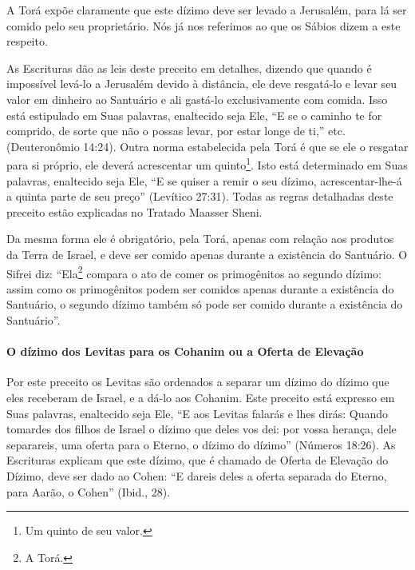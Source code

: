 A Torá expõe claramente que este dízimo deve ser levado a Jerusalém,
para lá ser comido pelo seu proprietário. Nós já nos referimos ao que os
Sábios dizem a este respeito.

As Escrituras dão as leis deste preceito em detalhes, dizendo que quando
é impossível levá-lo a Jerusalém devido à distância, ele deve resgatá-lo
e levar seu valor em dinheiro ao Santuário e ali gastá-lo
exclusivamente com comida. Isso está estipulado em Suas palavras,
enaltecido seja Ele, ``E se o caminho te for comprido, de sorte que não o possas levar, por estar longe de ti,'' etc. (Deuteronômio 14:24). Outra norma estabelecida pela Torá é que se ele o resgatar para si próprio, ele deverá acrescentar um
quinto\footnote{Um quinto de seu valor.}. Isto está determinado em Suas palavras,
enaltecido seja Ele, ``E se quiser a remir o seu dízimo, acrescentar-lhe-á a quinta parte de seu preço'' (Levítico 27:31).
Todas as regras detalhadas deste preceito estão explicadas no Tratado Maasser
Sheni.

Da mesma forma ele é obrigatório, pela Torá, apenas com relação aos
produtos da Terra de Israel, e deve ser comido apenas durante a
existência do Santuário. O Sifrei diz: ``Ela\footnote{A Torá.}
compara o ato de comer os primogênitos ao segundo dízimo: assim como os
primogênitos podem ser comidos apenas durante a existência do
Santuário, o segundo dízimo também só pode ser comido durante a
existência do Santuário''.

\paragraph{O dízimo dos Levitas para os Cohanim ou a Oferta de Elevação}

Por este preceito os Levitas são ordenados a separar um dízimo do dízimo
que eles receberam de Israel, e a dá-lo aos Cohanim. Este preceito
está expresso em Suas palavras, enaltecido seja Ele, ``E aos Levitas
falarás e lhes dirás: Quando tomardes dos filhos de Israel o dízimo que
deles vos dei: por vossa herança, dele separareis, uma oferta para o
Eterno, o dízimo do dízimo'' (Números 18:26). As Escrituras explicam que
este dízimo, que é chamado de Oferta de Elevação do Dízimo, deve ser
dado ao Cohen: ``E dareis deles a oferta separada do Eterno, para
Aarão, o Cohen'' (Ibid., 28).

